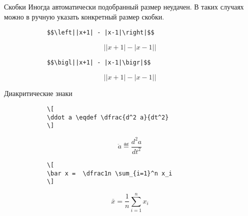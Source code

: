 \begin{frame}[fragile]{Скобки}
	Иногда автоматически подобранный размер неудачен. В таких случаях можно в ручную указать конкретный размер скобки.
	
	\begin{center}
		
	\end{center}
	
	\large
	
	\begin{minipage}{0.49\textwidth}
		\begin{verbatim}
			$$\left||x+1| - |x-1|\right|$$
		\end{verbatim}
	\end{minipage}
	\begin{minipage}{0.49\textwidth}
		$$\left||x+1| - |x-1|\right|$$
	\end{minipage}

	\begin{minipage}{0.49\textwidth}
		\begin{verbatim}
			$$\bigl||x+1| - |x-1|\bigr|$$
		\end{verbatim}
	\end{minipage}
	\begin{minipage}{0.49\textwidth}
		$$\bigl||x+1| - |x-1|\bigr|$$
	\end{minipage}
	
\end{frame}


\begin{frame}[fragile]{Диакритические знаки}
	\large
	\begin{center}
		
	\end{center}
	
	
	\begin{minipage}{0.59\textwidth}
		\begin{verbatim}
			\[
			\ddot a \eqdef \dfrac{d^2 a}{dt^2}
			\]
		\end{verbatim}
	\end{minipage}
	\begin{minipage}{0.39\textwidth}
		\Large
		\[
		\ddot a \eqdef \dfrac{d^2 a}{dt^2}
		\]
	\end{minipage}

	\begin{minipage}{0.59\textwidth}
		\begin{verbatim}
			\[
			\bar x =  \dfrac1n \sum_{i=1}^n x_i
			\]
		\end{verbatim}
	\end{minipage}
	\begin{minipage}{0.39\textwidth}
		\Large
		\[
		\bar x =  \dfrac1n \sum_{i=1}^n x_i
		\]
	\end{minipage}
\end{frame}

